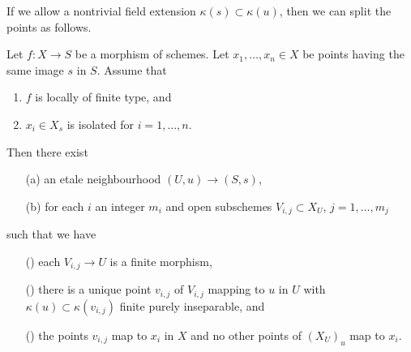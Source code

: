 \noindent
If we allow a nontrivial field extension
$\kappa(s) \subset \kappa(u)$, then we can
split the points as follows.

\begin{lemma}
\label{lemma-etale-makes-quasi-finite-finite-multiple-points-variant}
Let $f : X \to S$ be a morphism of schemes.
Let $x_1, \ldots, x_n \in X$ be points having the same image $s$ in $S$.
Assume that
\begin{enumerate}
\item $f$ is locally of finite type, and
\item $x_i \in X_s$ is isolated for $i = 1, \ldots, n$.
\end{enumerate}
Then there exist
\begin{enumerate}
\item[(a)] an etale neighbourhood $(U, u) \to (S, s)$,
\item[(b)] for each $i$ an integer $m_i$ and
open subschemes $V_{i, j} \subset X_U$, $j = 1, \ldots, m_j$
\end{enumerate}
such that we have
\begin{enumerate}
\item[(\romannumeral1)] each $V_{i, j} \to U$ is a finite morphism,
\item[(\romannumeral2)] there is a unique point $v_{i, j}$ of $V_{i, j}$
mapping to $u$ in $U$ with $\kappa(u) \subset \kappa(v_{i, j})$
finite purely inseparable, and
\item[(\romannumeral3)] the points $v_{i, j}$ map to $x_i$ in $X$ and
no other points of $(X_U)_u$ map to $x_i$.
\end{enumerate}
\end{lemma}

